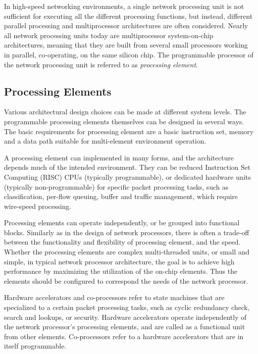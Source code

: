 In high-speed networking environments, a single network processing unit is not sufficient for executing all the different processing functions, but instead, different parallel processing and multiprocessor architectures are often considered. Nearly all network processing units today are multiprocessor system-on-chip architectures, meaning that they are built from several small processors working in parallel, co-operating, on the same silicon chip. The programmable processor of the network processing unit is referred to as \emph{processing element}.~\cite{Giladi:2008:Network, Papaefstathiou:2005:Queue}

\subsection{Processing Elements}
Various architectural design choices can be made at different system levels. The programmable processing elements themselves can be designed in several ways. The basic requirements for processing element are a basic instruction set, memory and a data path suitable for multi-element environment operation.~\cite{Giladi:2008:Network}

A processing element can implemented in many forms, and the architecture depends much of the intended environment. They can be reduced Instruction Set Computing (RISC) CPUs (typically programmable), or dedicated hardware units (typically non-programmable) for specific packet processing tasks, such as classification, per-flow queuing, buffer and traffic management, which require wire-speed processing.~\cite{Giladi:2008:Network}

Processing elements can operate independently, or be grouped into functional blocks. Similarly as in the design of network processors, there is often a trade-off between the functionality and flexibility of processing element, and the speed. Whether the processing elements are complex multi-threaded units, or small and simple, in typical network processor architecture, the goal is to achieve high performance by maximizing the utilization of the on-chip elements. Thus the elements should be configured to correspond the needs of the network processor.~\cite{Giladi:2008:Network}

Hardware accelerators and co-processors refer to state machines that are specialized to a certain packet processing tasks, such as cyclic redundancy check, search and lookups, or security. Hardware accelerators operate independently of the network processor's processing elements, and are called as a functional unit from other elements. Co-processors refer to a hardware accelerators that are in itself programmable.~\cite{Giladi:2008:Network}

